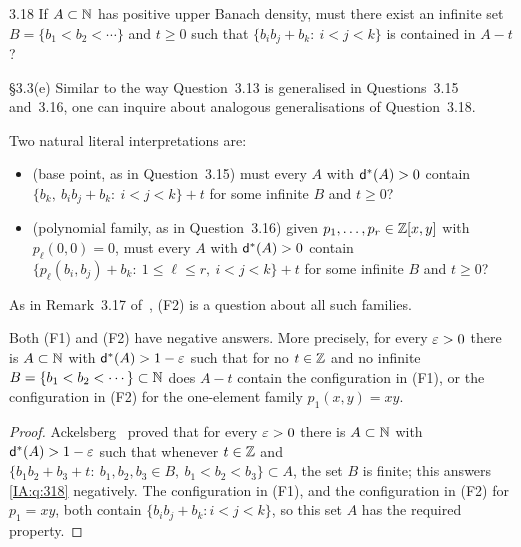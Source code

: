 \begin{question}{3.18}\label{IA:q:318}
If $A\subset\mathbb{N}$ has positive upper Banach density, must there exist an infinite set
$B=\{b_1<b_2<\cdots\}$ and $t\ge0$ such that $\{b_ib_j+b_k:\ i<j<k\}$ is contained in $A-t$?
\end{question}

\begin{question}{\S3.3(e)}\label{IA:q:u33e}
Similar to the way Question~3.13 is generalised in Questions~3.15 and~3.16, one can inquire about
analogous generalisations of Question~3.18.
\end{question}

Two natural literal interpretations are:
\begin{itemize}
\item[(F1)] (base point, as in Question~3.15) must every $A$ with $\mathsf{d}^*(A)>0$ contain
$\{b_k,\ b_ib_j+b_k:\ i<j<k\}+t$ for some infinite $B$ and $t\ge0$?
\item[(F2)] (polynomial family, as in Question~3.16) given $p_1,\dots,p_r\in\mathbb{Z}[x,y]$ with
$p_\ell(0,0)=0$, must every $A$ with $\mathsf{d}^*(A)>0$ contain
$\{p_\ell(b_i,b_j)+b_k:\ 1\le\ell\le r,\ i<j<k\}+t$ for some infinite $B$ and $t\ge0$?
\end{itemize}
As in Remark~3.17 of~\cite{kra2023problems}, (F2) is a question about all such families.

\begin{proposition}\label{IA:prop:u33e}
Both (F1) and (F2) have negative answers. More precisely, for every $\varepsilon>0$ there is $A\subset\mathbb{N}$
with $\mathsf{d}^*(A)>1-\varepsilon$ such that for no $t\in\mathbb{Z}$ and no infinite $B=\{b_1<b_2<\cdots\}\subset\mathbb{N}$ does
$A-t$ contain the configuration in (F1), or the configuration in (F2) for the one-element family
$p_1(x,y)=xy$.
\end{proposition}

\begin{proof}
Ackelsberg~\cite[Theorem~1.7]{ackelsberg2024counterexamples} proved that for every $\varepsilon>0$ there is
$A\subset\mathbb{N}$ with $\mathsf{d}^*(A)>1-\varepsilon$ such that whenever $t\in\mathbb{Z}$ and
$\{b_1b_2+b_3+t:\ b_1,b_2,b_3\in B,\ b_1<b_2<b_3\}\subset A$, the set $B$ is finite; this answers
\cref{IA:q:318} negatively. The configuration in (F1), and the configuration in (F2) for $p_1=xy$,
both contain $\{b_ib_j+b_k:i<j<k\}$, so this set $A$ has the required property.
\end{proof}


